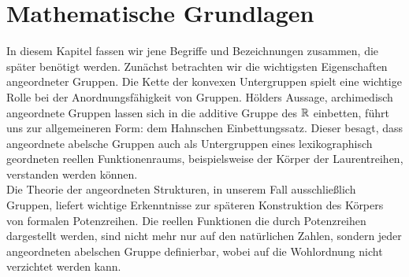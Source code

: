 \chapter{Mathematische Grundlagen}\label{chap2}
In diesem Kapitel fassen wir jene Begriffe und Bezeichnungen zusammen, die später benötigt werden. Zunächst betrachten wir die wichtigsten Eigenschaften angeordneter Gruppen. Die Kette der konvexen Untergruppen spielt eine wichtige Rolle bei der Anordnungsfähigkeit von Gruppen. Hölders Aussage, archimedisch angeordnete Gruppen lassen sich in die additive Gruppe des $\mathbb{R}$ einbetten,  führt uns zur allgemeineren Form: dem Hahnschen Einbettungssatz. Dieser besagt, dass angeordnete abelsche Gruppen auch als Untergruppen eines lexikographisch geordneten reellen Funktionenraums, beispielsweise der Körper der Laurentreihen, verstanden werden können. \\
Die Theorie der angeordneten Strukturen, in unserem Fall ausschließlich Gruppen, liefert wichtige Erkenntnisse zur späteren Konstruktion des Körpers von formalen Potenzreihen. Die reellen Funktionen die durch Potenzreihen dargestellt werden, sind nicht mehr nur auf den natürlichen Zahlen, sondern jeder angeordneten abelschen Gruppe definierbar, wobei auf die Wohlordnung nicht verzichtet werden kann.  
%
